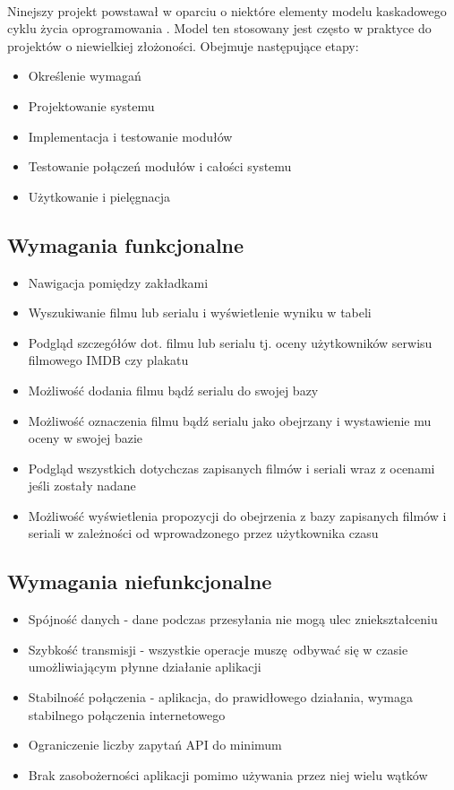 \documentclass[12pt,oneside,a4paper]{report}
\begin{document}
\paragraph{}Ninejszy projekt powstawał w oparciu o niektóre elementy modelu kaskadowego cyklu życia oprogramowania \cite{modelKaskadowy}. Model ten stosowany jest często w praktyce do projektów o niewielkiej złożoności. Obejmuje następujące etapy:
\begin{itemize}
	\item Określenie wymagań
	\item Projektowanie systemu
	\item Implementacja i testowanie modułów
	\item Testowanie połączeń modułów i całości systemu 
	\item Użytkowanie i pielęgnacja
\end{itemize}
\subsection{Wymagania funkcjonalne}
\begin{itemize}
	\item Nawigacja pomiędzy zakładkami
	\item Wyszukiwanie filmu lub serialu i wyświetlenie wyniku w tabeli
	\item Podgląd szczegółów dot. filmu lub serialu tj. oceny użytkowników serwisu filmowego IMDB czy plakatu
	\item Możliwość dodania filmu bądź serialu do swojej bazy
	\item Możliwość oznaczenia filmu bądź serialu jako obejrzany i wystawienie mu oceny w swojej bazie
	\item Podgląd wszystkich dotychczas zapisanych filmów i seriali wraz z ocenami jeśli zostały nadane
	\item Możliwość wyświetlenia propozycji do obejrzenia z bazy zapisanych filmów i seriali w zależności od wprowadzonego przez użytkownika czasu 
\end{itemize}

\subsection{Wymagania niefunkcjonalne}
\begin{itemize}
	\item Spójność danych - dane podczas przesyłania nie mogą ulec zniekształceniu
	\item Szybkość transmisji - wszystkie operacje muszę odbywać się w czasie umożliwiającym płynne działanie aplikacji
	\item Stabilność połączenia - aplikacja, do prawidłowego działania, wymaga stabilnego połączenia internetowego 
	\item Ograniczenie liczby zapytań API do minimum
	\item Brak zasobożerności aplikacji pomimo używania przez niej wielu wątków 
\end{itemize}
\end{document}
